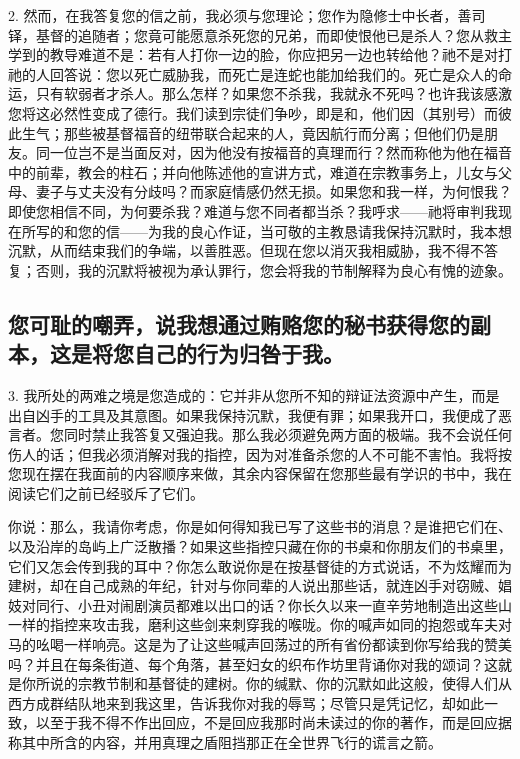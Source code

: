 2. 然而，在我答复您的信之前，我必须与您理论；您作为隐修士中长者，善司铎，基督的追随者；您竟可能愿意杀死您的兄弟，而即使恨他已是杀人？您从救主学到的教导难道不是：若有人打你一边的脸，你应把另一边也转给他？祂不是对打祂的人回答说：您以死亡威胁我，而死亡是连蛇也能加给我们的。死亡是众人的命运，只有软弱者才杀人。那么怎样？如果您不杀我，我就永不死吗？也许我该感激您将这必然性变成了德行。我们读到宗徒们争吵，即是和，他们因（其别号）而彼此生气；那些被基督福音的纽带联合起来的人，竟因航行而分离；但他们仍是朋友。同一位岂不是当面反对，因为他没有按福音的真理而行？然而称他为他在福音中的前辈，教会的柱石；并向他陈述他的宣讲方式，难道在宗教事务上，儿女与父母、妻子与丈夫没有分歧吗？而家庭情感仍然无损。如果您和我一样，为何恨我？即使您相信不同，为何要杀我？难道与您不同者都当杀？我呼求——祂将审判我现在所写的和您的信——为我的良心作证，当可敬的主教恳请我保持沉默时，我本想沉默，从而结束我们的争端，以善胜恶。但现在您以消灭我相威胁，我不得不答复；否则，我的沉默将被视为承认罪行，您会将我的节制解释为良心有愧的迹象。\par


\subsection{您可耻的嘲弄，说我想通过贿赂您的秘书获得您的副本，这是将您自己的行为归咎于我。}

3. 我所处的两难之境是您造成的：它并非从您所不知的辩证法资源中产生，而是出自凶手的工具及其意图。如果我保持沉默，我便有罪；如果我开口，我便成了恶言者。您同时禁止我答复又强迫我。那么我必须避免两方面的极端。我不会说任何伤人的话；但我必须消解对我的指控，因为对准备杀您的人不可能不害怕。我将按您现在摆在我面前的内容顺序来做，其余内容保留在您那些最有学识的书中，我在阅读它们之前已经驳斥了它们。\par

你说：那么，我请你考虑，你是如何得知我已写了这些书的消息？是谁把它们在、以及沿岸的岛屿上广泛散播？如果这些指控只藏在你的书桌和你朋友们的书桌里，它们又怎会传到我的耳中？你怎么敢说你是在按基督徒的方式说话，不为炫耀而为建树，却在自己成熟的年纪，针对与你同辈的人说出那些话，就连凶手对窃贼、娼妓对同行、小丑对闹剧演员都难以出口的话？你长久以来一直辛劳地制造出这些山一样的指控来攻击我，磨利这些剑来刺穿我的喉咙。你的喊声如同的抱怨或车夫对马的吆喝一样响亮。这是为了让这些喊声回荡过的所有省份都读到你写给我的赞美吗？并且在每条街道、每个角落，甚至妇女的织布作坊里背诵你对我的颂词？这就是你所说的宗教节制和基督徒的建树。你的缄默、你的沉默如此这般，使得人们从西方成群结队地来到我这里，告诉我你对我的辱骂；尽管只是凭记忆，却如此一致，以至于我不得不作出回应，不是回应我那时尚未读过的你的著作，而是回应据称其中所含的内容，并用真理之盾阻挡那正在全世界飞行的谎言之箭。\par

